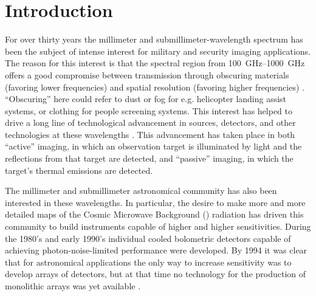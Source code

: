 \chapter{Introduction} \label{c:intro}



For over thirty years the millimeter and submillimeter-wavelength spectrum has been the subject of intense interest for military and security imaging applications.
The reason for this interest is that the spectral region from \SIrange{100}{1000}{\GHz} offers a good compromise between transmission through obscuring materials (favoring lower frequencies) and spatial resolution (favoring higher frequencies) \cite{kruse_why_1981}.
``Obscuring'' here could refer to dust or fog for e.g. helicopter landing assist systems, or clothing for people screening systems.
This interest has helped to drive a long line of technological advancement in sources, detectors, and other technologies at these wavelengths \cite{popovic_thz_2011,rogalski_terahertz_2011,rieke_detection_2003}.
This advancement has taken place in both ``active'' imaging, in which an observation target is illuminated by light and the reflections from that target are detected, and ``passive'' imaging, in which the target's thermal emissions are detected.

The millimeter and submillimeter astronomical community has also been interested in these wavelengths.
In particular, the desire to make more and more detailed maps of the Cosmic Microwave Background (\CMB) radiation has driven this community to build instruments capable of higher and higher sensitivities.
During the 1980's and early 1990's individual cooled bolometric detectors capable of achieving photon-noise-limited performance were developed.
By 1994 it was clear that for astronomical applications the only way to increase sensitivity was to develop arrays of detectors, but at that time no technology for the production of monolithic arrays was yet available \cite{richards_bolometers_1994}.


